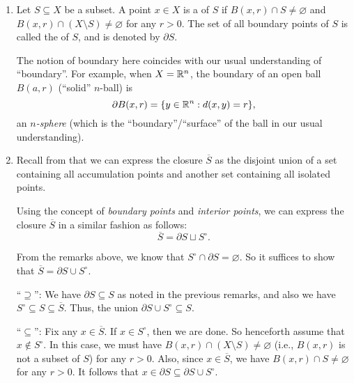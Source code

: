 \begin{enumerate}
\item Let \(S\subseteq X\) be a subset. A point \(x\in X\) is a  of \(S\) if \(B(x,r)\cap S\ne\varnothing\) and \(B(x,r)\cap (X\setminus
S)\ne\varnothing\) for any \(r>0\). The set of all boundary points of \(S\) is
called the  of \(S\), and is denoted by \(\partial S\).


The notion of boundary here coincides with our usual understanding of
``boundary''. For example, when \(X=\mathbb{R}^n\), the boundary of an open ball
\(B(a,r)\) (``solid'' \(n\)-ball) is
\[
\partial B(x,r)=\{y\in\mathbb{R}^n:d(x,y)=r\},
\]
an \emph{\(n\)-sphere} (which is the ``boundary''/``surface'' of the ball in
our usual understanding).

\item\label{it:closure-decompose-bound-interior} Recall from
 that we can express the closure
\(\overline{S}\) as the disjoint union of a set containing all accumulation
points and another set containing all isolated points.

Using the concept of \emph{boundary points} and \emph{interior points}, we can
express the closure \(\overline{S}\) in a similar fashion as follows:
\[
\overline{S}=\partial S\sqcup S^{\circ}.
\]
\begin{pf}
From the remarks above, we know that \(S^{\circ}\cap \partial S=\varnothing\).
So it suffices to show that \(\overline{S}=\partial S\cup S^{\circ}\).

``\(\supseteq\)'': We have \(\partial S\subseteq S\) as noted in the previous
remarks, and also we have \(S^{\circ}\subseteq S\subseteq \overline{S}\). Thus,
the union \(\partial S\cup S^{\circ}\subseteq S\).

``\(\subseteq\)'': Fix any \(x\in\overline{S}\). If \(x\in S^{\circ}\), then we
are done. So henceforth assume that \(x\notin S^{\circ}\). In this case, we
must have \(B(x,r)\cap (X\setminus S)\ne\varnothing\) (i.e., \(B(x,r)\) is not
a subset of \(S\)) for any \(r>0\). Also, since \(x\in\overline{S}\), we have
\(B(x,r)\cap S\ne\varnothing\) for any \(r>0\). It follows that \(x\in\partial
S\subseteq \partial S\cup S^{\circ}\).
\end{pf}
\end{enumerate}
